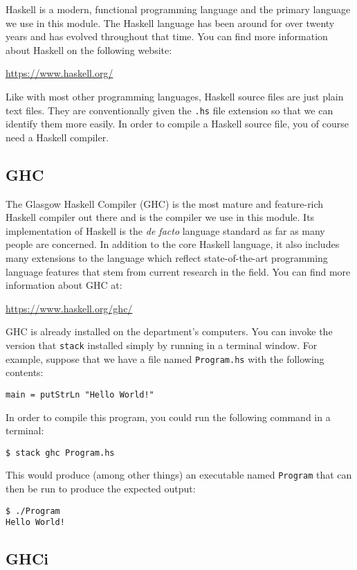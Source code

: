 Haskell is a modern, functional programming language and the primary language we use in this module. The Haskell language has been around for over twenty years and has evolved throughout that time. You can find more information about Haskell on the following website:
\begin{center}
	\url{https://www.haskell.org/}
\end{center}
Like with most other programming languages, Haskell source files are just plain text files. They are conventionally given the \texttt{\small .hs} file extension so that we can identify them more easily. In order to compile a Haskell source file, you of course need a Haskell compiler.

\subsection{GHC}

The Glasgow Haskell Compiler (GHC) is the most mature and feature-rich Haskell compiler out there and is the compiler we use in this module. Its implementation of Haskell is the \emph{de facto} language standard as far as many people are concerned. In addition to the core Haskell language, it also includes many extensions to the language which reflect state-of-the-art programming language features that stem from current research in the field. You can find more information about GHC at:
\begin{center}
	\url{https://www.haskell.org/ghc/}
\end{center}
GHC is already installed on the department's computers. You can invoke the version that \texttt{\small stack} installed simply by running  in a terminal window. For example, suppose that we have a file named \texttt{\small Program.hs} with the following contents:
\begin{verbatim}
main = putStrLn "Hello World!"
\end{verbatim}
In order to compile this program, you could run the following command in a terminal:
\begin{verbatim}
$ stack ghc Program.hs
\end{verbatim}
This would produce (among other things) an executable named \texttt{\small Program} that can then be run to produce the expected output:
\begin{verbatim}
$ ./Program 
Hello World!
\end{verbatim}

\subsection{GHCi}

